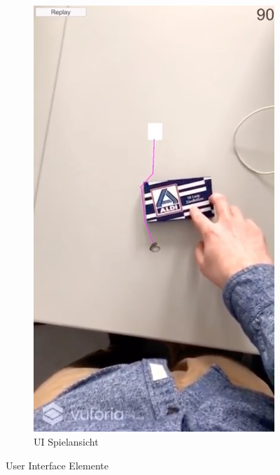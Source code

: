 \begin{figure}[H]
\begin{subfigure}[b]{0.3\textwidth}
        \includegraphics[width=\textwidth]{assets/uiGame}
        \caption{UI Spielansicht}
        \label{fig:uiGame}
    \end{subfigure}
    \caption{User Interface Elemente}\label{fig:uiElements}
\end{figure}

